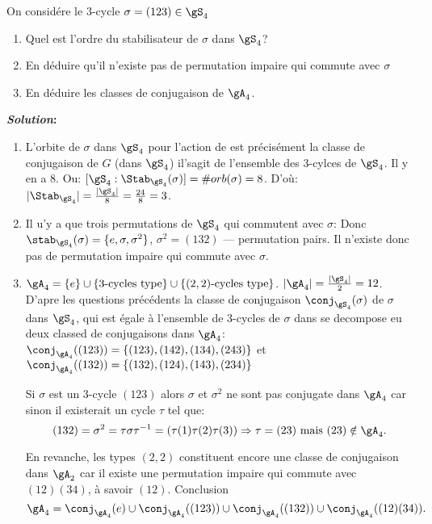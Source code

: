 \begin{exercise}

	On considére le 3-cycle $\sigma=(123)\in\gS_4$
	\begin{enumerate}
		\item Quel est l'ordre du stabilisateur de $\sigma$ dans $\gS_4$?
		\item En déduire qu'il n'existe pas de permutation impaire qui commute avec $\sigma$
		\item En déduire les classes de conjugaison de $\gA_4$.
	\end{enumerate}

	\textbf{\emph{Solution}:}

	\begin{enumerate}

		\item L'orbite de $\sigma$ dans $\gS_4$ pour l'action de est précisément la classe de conjugaison de $G$ (dans $\gS_4$) il'sagit de l'ensemble des 3-cylces de $\gS_4$. Il y en a 8. Ou: $[\gS_4: \Stab_{\gS_4}(\sigma)]=\#orb(\sigma)=8$. D'où: $|\Stab_{\gS_4}|=\frac{|\gS_4|}{8}=\frac{24}{8}=3$.

		\item Il u'y a que trois permutations de $\gS_4$ qui commutent avec $\sigma$: Donc $\stab_{\gS_4}(\sigma)=\{e,\sigma,\sigma^2\}$, $\sigma^2=(132)$ --- permutation pairs. Il n'existe donc pas de permutation impaire qui commute avec $\sigma$.

		\item $\gA_4=\{e\}\cup\{3\text{-cycles type}\}\cup\{(2,2)\text{-cycles type}\}$. $|\gA_4|=\frac{|\gS_4|}2=12$.
		D'apre les questions précédents la classe de conjugaison $\conj_{\gS_4}(\sigma)$ de $\sigma$ dans $\gS_4$, qui est égale à l'ensemble de 3-cycles de $\sigma$ dans se decompose eu deux classed de conjugaisons dans $\gA_4$:\\ $\conj_{\gA_4}((123))=\{(123), (142), (134), (243)\}$ et\\$\conj_{\gA_4}((132))=\{(132), (124), (143), (234)\}$


		\begin{remark}
			Si $\sigma$ est un 3-cycle $(123)$ alors $\sigma$ et $\sigma^2$ ne sont pas conjugate dans $\gA_4$ car sinon il existerait un cycle $\tau$ tel que:
			$$(132)=\sigma^2=\tau\sigma\tau^{-1}=(\tau(1)\tau(2)\tau(3)) \Rightarrow \tau=(23) \mbox{ mais } (23)\notin \gA_4.$$
		\end{remark}


		En revanche, les types $(2,2)$ constituent encore une classe de conjugaison dans $\gA_2$ car il existe une permutation impaire qui commute avec $(12)(34)$, à savoir $(12)$. Conclusion $$\gA_4=\conj_{\gA_4}(e)\cup \conj_{\gA_4}((123))\cup \conj_{\gA_4}((132))\cup \conj_{\gA_4}((12)(34)).$$


\end{enumerate}
\end{exercise}
